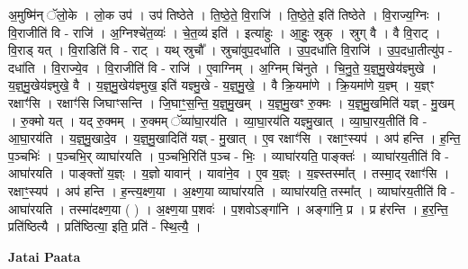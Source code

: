 \documentclass[17pt]{extarticle}
\begin{document}
अ॒मुष्मि॑न् ॅलो॒के । लो॒क उप॑ । उप॑ तिष्ठेते । ति॒ष्ठे॒ते॒ वि॒राजि॑ । ति॒ष्ठे॒ते॒ इति॑ तिष्ठेते । वि॒राज्य॒ग्निः । वि॒राजीति॑ वि - राजि॑ । अ॒ग्निश्चे॑त॒व्यः॑ । चे॒त॒व्य॑ इति॑ । इत्या॑हुः । आ॒हुः॒ स्रुक् । स्रुग् वै । वै वि॒राट् । वि॒राड् यत् । वि॒राडिति॑ वि - राट् । यथ् स्रुचौ᳚ । स्रुचा॑वुप॒दधा॑ति । उ॒प॒दधा॑ति वि॒राजि॑ । उ॒प॒दधा॒तीत्यु॑प - दधा॑ति । वि॒राज्ये॒व । वि॒राजीति॑ वि - राजि॑ । ए॒वाग्निम् । अ॒ग्निम् चि॑नुते । चि॒नु॒ते॒ य॒ज्ञ्॒मु॒खेय॑ज्ञ्मुखे । य॒ज्ञ्॒मु॒खेय॑ज्ञ्मुखे॒ वै । य॒ज्ञ्॒मु॒खेय॑ज्ञ्मुख॒ इति॑ यज्ञ्मु॒खे - य॒ज्ञ्॒मु॒खे॒ । वै क्रि॒यमा॑णे । क्रि॒यमा॑णे य॒ज्ञ्म् । य॒ज्ञ्ꣳ रक्षाꣳ॑सि । रक्षाꣳ॑सि जिघाꣳसन्ति । जि॒घाꣳ॒॒स॒न्ति॒ य॒ज्ञ्॒मु॒खम् । य॒ज्ञ्॒मु॒खꣳ रु॒क्मः । य॒ज्ञ्॒मु॒खमिति॑ यज्ञ् - मु॒खम् । रु॒क्मो यत् । यद् रु॒क्मम् । रु॒क्मम् ॅव्या॑घा॒रय॑ति । व्या॒घा॒रय॑ति यज्ञ्मु॒खात् । व्या॒घा॒रय॒तीति॑ वि - आ॒घा॒रय॑ति । य॒ज्ञ्॒मु॒खादे॒व । य॒ज्ञ्॒मु॒खादिति॑ यज्ञ् - मु॒खात् । ए॒व रक्षाꣳ॑सि । रक्षाꣳ॒॒स्यप॑ । अप॑ हन्ति । ह॒न्ति॒ प॒ञ्चभिः॑ । प॒ञ्चभि॒र् व्याघा॑रयति । प॒ञ्चभि॒रिति॑ प॒ञ्च - भिः॒ । व्याघा॑रयति॒ पाङ्क्तः॑ । व्याघा॑रय॒तीति॑ वि - आघा॑रयति । पाङ्क्तो॑ य॒ज्ञ्ः । य॒ज्ञो यावान्॑ । यावा॑ने॒व । ए॒व य॒ज्ञ्ः । य॒ज्ञ्स्तस्मा᳚त् । तस्मा॒द् रक्षाꣳ॑सि । रक्षाꣳ॒॒स्यप॑ । अप॑ हन्ति । ह॒न्त्य॒क्ष्ण॒या । अ॒क्ष्ण॒या व्याघा॑रयति । व्याघा॑रयति॒ तस्मा᳚त् । व्याघा॑रय॒तीति॑ वि - आघा॑रयति । तस्मा॑दक्ष्ण॒या ( ) । अ॒क्ष्ण॒या प॒शवः॑ । प॒शवोऽङ्गा॑नि । अङ्गा॑नि॒ प्र । प्र ह॑रन्ति । ह॒र॒न्ति॒ प्रति॑ष्ठित्यै । प्रति॑ष्ठित्या॒ इति॒ प्रति॑ - स्थि॒त्यै॒ । \newline

\textbf{Jatai Paata} \newline
\end{document}
